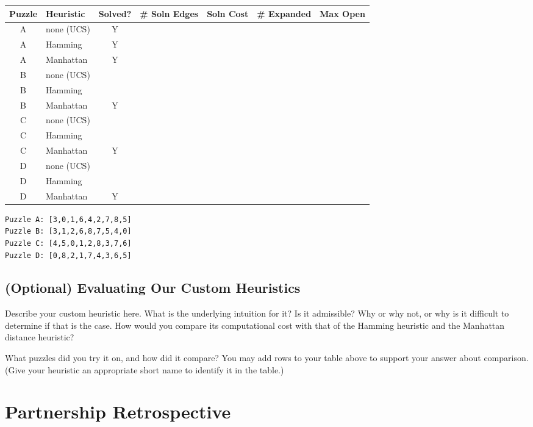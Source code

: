 \documentclass{article}
\begin{document}
{\flushleft
\begin{tabular}{|c|l|c|l|c|c|c|}
\hline
Puzzle & Heuristic & Solved? & \# Soln Edges & Soln Cost & \# Expanded & Max Open\\
\hline
A & none (UCS) & Y & & & & \\
\hline
A & Hamming & Y & & & & \\
\hline
A & Manhattan & Y & & & & \\
\hline
B & none (UCS) & & & & & \\
\hline
B & Hamming &  & & & & \\
\hline
B & Manhattan & Y & & & & \\
\hline
C & none (UCS) & & & & & \\
\hline
C & Hamming &  & & & & \\
\hline
C & Manhattan & Y & & & & \\
\hline
D & none (UCS) & & & & & \\
\hline
D & Hamming &  & & & & \\
\hline
D & Manhattan & Y & & & & \\
\hline

\end{tabular} }

\begin{verbatim}
Puzzle A: [3,0,1,6,4,2,7,8,5]
Puzzle B: [3,1,2,6,8,7,5,4,0]
Puzzle C: [4,5,0,1,2,8,3,7,6]
Puzzle D: [0,8,2,1,7,4,3,6,5]
\end{verbatim}

\subsection{(Optional) Evaluating Our Custom Heuristics}

Describe your custom heuristic here.  What is the underlying intuition for it?
Is it admissible? Why or why not, or why is it difficult to determine if that
is the case.  How would you compare its computational cost with that of
the Hamming heuristic and the Manhattan distance heuristic?

What puzzles did you try it on, and how did it compare?
You may add rows to your table above to support your answer about comparison.
(Give your heuristic an appropriate short name to identify it in the table.)

\newpage
\section{Partnership Retrospective}
\end{document}
